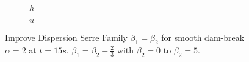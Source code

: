 \documentclass[10pt]{article}
\begin{document}
\begin{figure}
	\centering
	\begin{subfigure}{0.49\textwidth}
		\centering
		
		\caption{$h$}
	\end{subfigure}
	\begin{subfigure}{0.49\textwidth}
		\centering
		
		\caption{$u$}
	\end{subfigure}
	\caption{Improve Dispersion Serre Family $\beta_1 = \beta_2$ for smooth dam-break $\alpha = 2$ at $t=15s$. $\beta_1 = \beta_2 - \frac{2}{3}$ with  $\beta_2 = 0$ to $\beta_2 = 5$. }
\end{figure}

\end{document}
